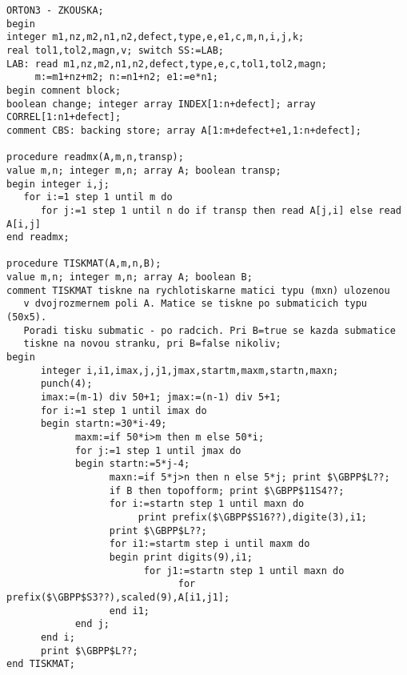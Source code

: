 \begin{lstlisting}[mathescape]
ORTON3 - ZKOUSKA;
begin
integer m1,nz,m2,n1,n2,defect,type,e,e1,c,m,n,i,j,k;
real tol1,tol2,magn,v; switch SS:=LAB;
LAB: read m1,nz,m2,n1,n2,defect,type,e,c,tol1,tol2,magn;
     m:=m1+nz+m2; n:=n1+n2; e1:=e*n1;
begin comnent block;
boolean change; integer array INDEX[1:n+defect]; array CORREL[1:n1+defect];
comment CBS: backing store; array A[1:m+defect+e1,1:n+defect];

procedure readmx(A,m,n,transp);
value m,n; integer m,n; array A; boolean transp;
begin integer i,j;
   for i:=1 step 1 until m do
      for j:=1 step 1 until n do if transp then read A[j,i] else read A[i,j]
end readmx;

procedure TISKMAT(A,m,n,B);
value m,n; integer m,n; array A; boolean B;
comment TISKMAT tiskne na rychlotiskarne matici typu (mxn) ulozenou
   v dvojrozmernem poli A. Matice se tiskne po submaticich typu (50x5).
   Poradi tisku submatic - po radcich. Pri B=true se kazda submatice
   tiskne na novou stranku, pri B=false nikoliv;
begin
      integer i,i1,imax,j,j1,jmax,startm,maxm,startn,maxn;
      punch(4);
      imax:=(m-1) div 50+1; jmax:=(n-1) div 5+1;
      for i:=1 step 1 until imax do
      begin startn:=30*i-49;
            maxm:=if 50*i>m then m else 50*i;
            for j:=1 step 1 until jmax do
            begin startn:=5*j-4;
                  maxn:=if 5*j>n then n else 5*j; print $\GBPP$L??;
                  if B then topofform; print $\GBPP$11S4??;
                  for i:=startn step 1 until maxn do
                       print prefix($\GBPP$S16??),digite(3),i1;
                  print $\GBPP$L??;
                  for i1:=startm step i until maxm do
                  begin print digits(9),i1;
                        for j1:=startn step 1 until maxn do
                              for prefix($\GBPP$S3??),scaled(9),A[i1,j1];
                  end i1;
            end j;
      end i;
      print $\GBPP$L??;
end TISKMAT;
\end{lstlisting}

